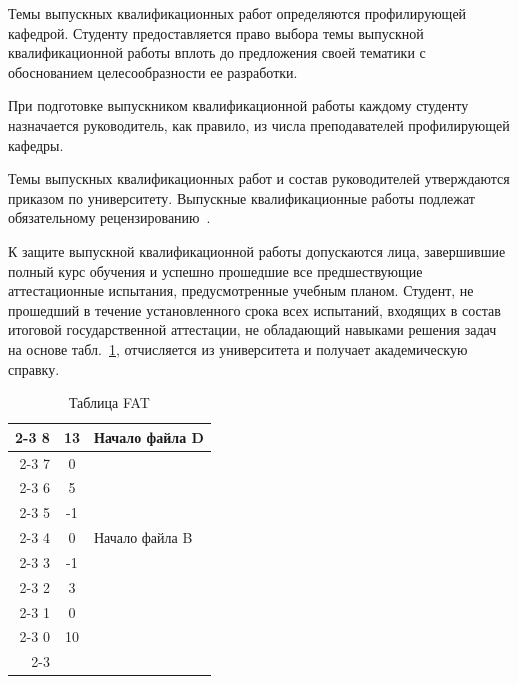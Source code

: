 \documentclass[14pt]{extarticle} %
\begin{document}
Темы выпускных квалификационных работ определяются профилирующей кафедрой. 
Студенту предоставляется право выбора темы выпускной квалификационной работы 
вплоть до предложения своей тематики с обоснованием целесообразности ее разработки.


При подготовке выпускником квалификационной работы каждому студенту назначается 
руководитель, как правило, из числа преподавателей профилирующей кафедры.

Темы выпускных квалификационных работ и состав руководителей утверждаются приказом 
по университету. Выпускные квалификационные работы подлежат обязательному 
рецензированию~\cite{Kaz11,Bal19,gostMagma,lawEdu}. 


К защите выпускной квалификационной работы допускаются лица, завершившие полный курс 
обучения и успешно прошедшие все предшествующие аттестационные испытания, 
предусмотренные учебным планом. Студент, не прошедший в течение установленного 
срока всех испытаний, входящих в состав итоговой государственной аттестации, не обладающий навыками решения задач на основе табл.~\ref{t1}, 
отчисляется из университета и получает академическую справку.

\begin{table}[h]
\centering
\caption{Таблица FAT}
\label{t1}
\begin{tabular}{r|c|l|}
\cline{2-3}
 8 & 13 & Начало файла D  \\ \cline{2-3}
 7 &  0 &   \\ \cline{2-3}
 6 &  5 &   \\ \cline{2-3}
 5 & -1 &   \\ \cline{2-3}
 4 &  0 & Начало файла B  \\ \cline{2-3}
 3 & -1 &   \\ \cline{2-3}
 2 &  3 &   \\ \cline{2-3}
 1 &  0 &   \\ \cline{2-3}
 0 & 10 &   \\ \cline{2-3}
\end{tabular}
\end{table}
\end{document}
